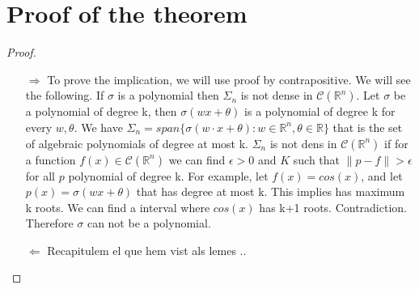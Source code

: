 \documentclass[../main.tex]{subfiles}
\begin{document}
\section{Proof of the theorem}
	\begin{proof}~ %

	\begin{enumerate}
		\item[$\Rightarrow$] To prove the implication, we will use proof by contrapositive. We will see the following. If $\sigma$ is a polynomial then $\Sigma_n$ is not dense in $\mathcal{C}(\mathbb{R}^n)$. Let $\sigma$ be a polynomial of degree k, then $\sigma(wx+\theta)$ is a polynomial  of degree k for every $w,\theta$. We have $ \Sigma_n = span\{\sigma(w\cdot x + \theta) : w\in \mathbb{R}^n, \theta \in \mathbb{R} \}$ that is the set of algebraic polynomials of degree at most k. $\Sigma_n$ is not dens in $\mathcal{C}(\mathbb{R}^n)$ if for a function $f(x)\in \mathcal{C}(\mathbb{R}^n)$ we can find $\epsilon > 0$ and $K$ such that  $\| p-f \| > \epsilon$ for all $p$ polynomial of degree k. For example, let $f(x)=cos(x)$, and let $p(x)= \sigma(wx+\theta)$ that has degree at most k. This implies has maximum k roots. We can find a interval where $cos(x)$ has k+1 roots. Contradiction. Therefore $\sigma$ can not be a polynomial. 

		\item[$\Leftarrow$]  Recapitulem el que hem vist als lemes ..
	\end{enumerate}
\end{proof}
	\cite{leshno1993multilayer}
\end{document}
